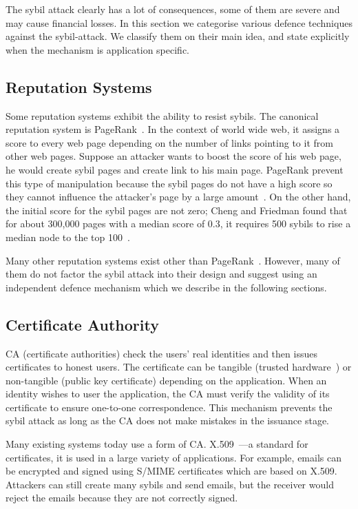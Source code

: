 The sybil attack clearly has a lot of consequences, some of them are severe and
may cause financial losses. In this section we categorise various defence
techniques against the sybil-attack. We classify them on their main idea, and
state explicitly when the mechanism is application specific.

\subsection{Reputation Systems}
Some reputation systems exhibit the ability to resist sybils. The canonical
reputation system is PageRank~\cite{page1999pagerank}. In the context of world
wide web, it assigns a score to every web page depending on the number of links
pointing to it from other web pages. Suppose an attacker wants to boost the
score of his web page, he would create sybil pages and create link to his main
page. PageRank prevent this type of manipulation because the sybil pages do not
have a high score so they cannot influence the attacker's page by a large
amount~\cite{baeza2005pagerank}. On the other hand, the initial score for the
sybil pages are not zero; Cheng and Friedman found that for about 300,000 pages
with a median score of 0.3, it requires 500 sybils to rise a median node to the
top 100~\cite{cheng2006manipulability}.

Many other reputation systems exist other than
PageRank~\cite{kamvar2003eigentrust, srivatsa2005trustguard,
  nandi2005scrivener}. However, many of them do not factor the sybil attack into
their design and suggest using an independent defence mechanism which we
describe in the following sections.

\subsection{Certificate Authority}\label{sec:cert-authority}
CA (certificate authorities) check the users' real identities and then issues
certificates to honest users. The certificate can be tangible (trusted
hardware~\cite{newsome2004sybil}) or non-tangible (public key certificate)
depending on the application. When an identity wishes to user the application,
the CA must verify the validity of its certificate to ensure one-to-one
correspondence. This mechanism prevents the sybil attack as long as the CA does
not make mistakes in the issuance stage.

Many existing systems today use a form of CA.
X.509~\cite{housley2002internet}---a standard for certificates, it is used in a
large variety of applications. For example, emails can be encrypted and signed
using S/MIME\cite{ramsdell2010secure} certificates which are based on X.509.
Attackers can still create many sybils and send emails, but the receiver would
reject the emails because they are not correctly signed.

